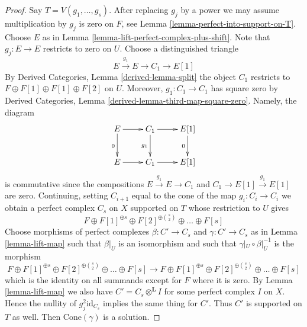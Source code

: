 \documentclass{stacks-project}
\theoremstyle{plain}
\theoremstyle{definition}
\theoremstyle{remark}
\numberwithin{equation}{subsection}
\begin{document}
\begin{proof}
Say $T = V(g_1, \ldots, g_s)$. After replacing $g_j$ by a power we
may assume multiplication by $g_j$ is zero on $F$, see
Lemma \ref{lemma-perfect-into-support-on-T}. Choose $E$ as in
Lemma \ref{lemma-lift-perfect-complex-plus-shift}.
Note that $g_j : E \to E$ restricts to zero on $U$.
Choose a distinguished triangle
$$
E \xrightarrow{g_1} E \to C_1 \to E[1]
$$
By Derived Categories, Lemma \ref{derived-lemma-split}
the object $C_1$ restricts to
$F \oplus F[1] \oplus F[1] \oplus F[2]$ on $U$.
Moreover, $g_1 : C_1 \to C_1$ has square zero by
Derived Categories, Lemma \ref{derived-lemma-third-map-square-zero}.
Namely, the diagram
$$
\xymatrix{
E \ar[r] \ar[d]_0 & C_1 \ar[d]_{g_1} \ar[r] & E[1] \ar[d]_0 \\
E \ar[r] & C_1 \ar[r] & E[1]
}
$$
is commutative since the compositions $E \xrightarrow{g_1} E \to C_1$ and
$C_1 \to E[1] \xrightarrow{g_1} E[1]$ are zero. Continuing, setting
$C_{i + 1}$ equal to the cone of the map $g_i : C_i \to C_i$ we obtain
a perfect complex $C_s$ on $X$ supported on $T$
whose restriction to $U$ gives
$$
F \oplus F[1]^{\oplus s} \oplus F[2]^{\oplus {s \choose 2}}
\oplus \ldots \oplus F[s]
$$
Choose morphisms of perfect complexes $\beta : C' \to C_s$
and $\gamma : C' \to C_s$ as in Lemma \ref{lemma-lift-map}
such that $\beta|_U$ is an isomorphism and such that
$\gamma|_U \circ \beta|_U^{-1}$ is the morphism
$$
F \oplus F[1]^{\oplus s} \oplus F[2]^{\oplus {s \choose 2}}
\oplus \ldots \oplus F[s]
\to
F \oplus F[1]^{\oplus s} \oplus F[2]^{\oplus {s \choose 2}}
\oplus \ldots \oplus F[s]
$$
which is the identity on all summands except for $F$ where it is zero.
By Lemma \ref{lemma-lift-map} we also have
$C' = C_s \otimes^\mathbf{L} I$ for some perfect complex
$I$ on $X$. Hence the nullity of $g_j^2\text{id}_{C_s}$ implies the
same thing for $C'$. Thus $C'$ is supported on $T$ as well.
Then $\text{Cone}(\gamma)$ is a solution.
\end{proof}
\end{document}
